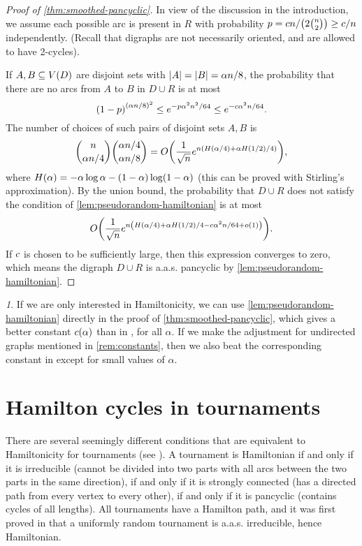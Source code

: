 \documentclass[11pt,english]{article}
\theoremstyle{plain}
\theoremstyle{definition}
\theoremstyle{definition}
\theoremstyle{plain}
\theoremstyle{plain}
\theoremstyle{plain}
\theoremstyle{plain}
\theoremstyle{remark}
\newtheorem{rem}[thm]{\protect\remarkname}
\theoremstyle{remark}
\let\originalleft\left
\let\originalright\right
\renewcommand{\left}{\mathopen{}\mathclose\bgroup\originalleft}
\renewcommand{\right}{\aftergroup\egroup\originalright}
\providecommand{\remarkname}{Remark}
\begin{document}
\begin{proof}
[Proof of \ref{thm:smoothed-pancyclic}]In view of the discussion
in the introduction, we assume each possible arc is present in $R$
with probability $p=\cdi n/\left(2{n \choose 2}\right)\ge\cdi/n$ independently. (Recall that digraphs are not necessarily oriented, and are allowed to have 2-cycles).

If $A,B\subseteq V\left(D\right)$ are disjoint sets with $\left|A\right|=\left|B\right|=\alpha n/8$,
the probability that there are no arcs from $A$ to $B$ in $D\cup R$
is at most
\[
\left(1-p\right)^{\left(\alpha n/8\right)^{2}}\le e^{-p\alpha^{2}n^{2}/64}\le e^{-\cdi\alpha^{2}n/64}.
\]
The number of choices of such pairs of disjoint sets $A,B$ is
\[
{n \choose \alpha n/4}{\alpha n/4 \choose \alpha n/8}=O\left(\frac{1}{\sqrt{n}}e^{n\left(H\left(\alpha/4\right)+\alpha H\left(1/2\right)/4\right)}\right),
\]
where $H\left(\alpha\right)=-\alpha\log\alpha-\left(1-\alpha\right)\log\left(1-\alpha\right)$
(this can be proved with Stirling's approximation). By the union bound,
the probability that $D\cup R$ does not satisfy the condition of
\ref{lem:pseudorandom-hamiltonian} is at most
\[
O\left(\frac{1}{\sqrt{n}}e^{n\left(H\left(\alpha/4\right)+\alpha H\left(1/2\right)/4-\cdi\alpha^{2}n/64+o\left(1\right)\right)}\right).
\]
If $c$ is chosen to
be sufficiently large, then this expression converges to zero, which means the digraph $D\cup R$ is a.a.s. pancyclic by \ref{lem:pseudorandom-hamiltonian}.\end{proof}
\begin{rem}
If we are only interested in Hamiltonicity, we can use \ref{lem:pseudorandom-hamiltonian}
directly in the proof of \ref{thm:smoothed-pancyclic}, which gives
a better constant $\cdi\left(\alpha\right)$ than in \cite[Theorem~3]{BFM03},
for all $\alpha$. If we make the adjustment for undirected graphs
mentioned in \ref{rem:constants}, then we also beat the corresponding
constant in \cite[Theorem~1]{BFM03} except for small values of $\alpha$.
\end{rem}

\section{\label{sec:tournaments}Hamilton cycles in tournaments}

There are several seemingly different conditions that are equivalent
to Hamiltonicity for tournaments (see \cite[Chapters~2-3]{Moo68}).
A tournament is Hamiltonian if and only if it is irreducible (cannot
be divided into two parts with all arcs between the two parts
in the same direction), if and only if it is strongly connected (has
a directed path from every vertex to every other), if and only if
it is pancyclic (contains cycles of all lengths). All tournaments
have a Hamilton path, and it was first proved in \cite{MM62} that
a uniformly random tournament is a.a.s. irreducible, hence Hamiltonian.
\end{document}
